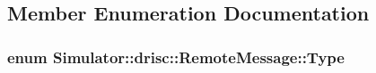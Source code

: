 \subsection{Member Enumeration Documentation}
\hypertarget{struct_simulator_1_1drisc_1_1_remote_message_aa6920cd59d9069d038eeb3ddfa9fd7cd}{
\subsubsection[{Type}]{\setlength{\rightskip}{0pt plus 5cm}enum {\bf Simulator\+::drisc\+::\+Remote\+Message\+::\+Type}}}\label{struct_simulator_1_1drisc_1_1_remote_message_aa6920cd59d9069d038eeb3ddfa9fd7cd}
